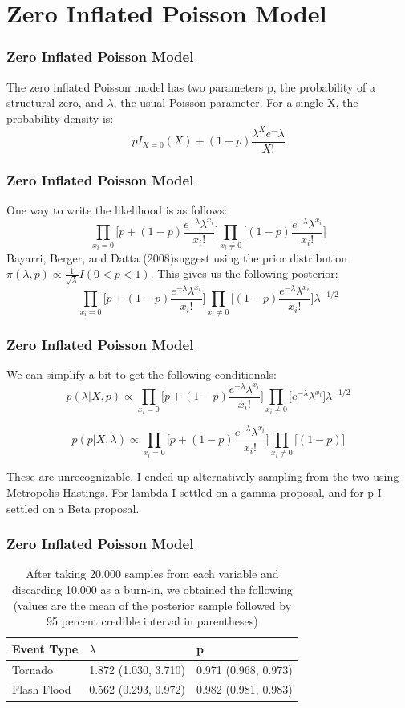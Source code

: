 \documentclass{beamer}
\begin{document}
	\section{Zero Inflated Poisson Model}
	\begin{frame}
		\frametitle{Zero Inflated Poisson Model}
		The zero inflated Poisson model has two parameters p, the probability of a structural zero, and $\lambda$, the usual Poisson parameter. 
		For a single X, the probability density is:
		$$pI_{X=0}(X) + (1-p)\frac{\lambda^Xe^-\lambda}{X!}$$
	\end{frame}
	\begin{frame}
		\frametitle{Zero Inflated Poisson Model}
		One way to write the likelihood is as follows:
		$$\prod_{x_i=0}\bigg[p+(1-p)\frac{e^{-\lambda}\lambda^{x_i}}{x_i!}\bigg]\prod_{x_i \ne 0}\bigg[(1-p)\frac{e^{-\lambda}\lambda^{x_i}}{x_i!}\bigg]$$
		Bayarri, Berger, and Datta (2008)\footnotemark suggest using the prior distribution $\pi(\lambda, p) \propto \frac{1}{\sqrt{\lambda}}I(0<p<1)$. This gives us the following posterior:
		$$\prod_{x_i=0}\bigg[p+(1-p)\frac{e^{-\lambda}\lambda^{x_i}}{x_i!}\bigg]\prod_{x_i \ne 0}\bigg[(1-p)\frac{e^{-\lambda}\lambda^{x_i}}{x_i!}\bigg]\lambda^{-1/2}$$
	\end{frame}
	\begin{frame}
		\frametitle{Zero Inflated Poisson Model}
		We can simplify a bit to get the following conditionals:
		\[
p(\lambda|X, p) \propto \prod_{x_i=0}\bigg[p+(1-p)\frac{e^{-\lambda}\lambda^{x_i}}{x_i!}\bigg]\prod_{x_i \ne 0}\bigg[e^{-\lambda}\lambda^{x_i}\bigg]\lambda^{-1/2}
\]

\[
p(p|X, \lambda) \propto \prod_{x_i=0}\bigg[p+(1-p)\frac{e^{-\lambda}\lambda^{x_i}}{x_i!}\bigg]\prod_{x_i \ne 0}\bigg[(1-p)\bigg]
\]

These are unrecognizable. I ended up alternatively sampling from the two using Metropolis Hastings. For lambda I settled on a gamma proposal, and for p I settled on a Beta proposal. 
	\end{frame}
	\begin{frame}
		\frametitle{Zero Inflated Poisson Model}
		\begin{table}
    \centering
    \caption{After taking 20,000 samples from each variable and discarding 10,000 as a burn-in, we obtained the following (values are the mean of the posterior sample followed by 95 percent credible interval in parentheses)}
    \label{t:rZIP}
    \begin{tabular}{| l | l | l |}
    \hline
    Event Type & $\lambda$ & p  \\ \hline
    Tornado & 1.872 (1.030, 3.710) & 0.971 (0.968, 0.973) \\ \hline
    Flash Flood & 0.562 (0.293, 0.972) & 0.982 (0.981, 0.983) \\ \hline
    \end{tabular}
\end{table}
	\end{frame}
\end{document}
